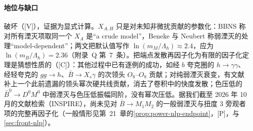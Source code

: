 \paragraph{地位与缺口}
破坏（[V]），证据为显式计算。$X_{A,H}$ 只是对未知非微扰贡献的参数化：BBNS 称对所有湮灭项取同一个 $X_A$ 是“a crude model”\cite{BenekeEtAl2001}，Beneke 与 Neubert 称弱湮灭的处理“model-dependent”\cite{BenekeNeubert2003}；两文把默认值写作 $\ln(m_M/\Lambda_h)\approx2.4$，应为 $\ln(m_B/\Lambda_h)=2.36$（附录~Q 第~7~条）。把端点发散再因子化为有限的因子化定理是猜想性质的（[C]）：其他过程中已有逐例的成功，如经 $b$ 夸克圈的 $h\to\gamma\gamma$\cite{Liu:2019oav,Liu:2020wbn}、经轻夸克的 $gg\to h$\cite{Liu:2022ajh}、$\bar B\to X_s\gamma$ 的次领头 $O_8$--$O_8$ 贡献\cite{Hurth:2023paz}；对纯弱湮灭衰变，有文献补上一个此前遗漏的领头幂次硬共线贡献，消去了卷积中的快度发散\cite{Lu:2022kos}；色压低的 $\bar B^0\to D^0M^0$ 中弱湮灭与色压低振幅同阶，没有幂次压低\cite{Mantry:2003uz}。据我们截至 2026 年 10 月的文献检索（INSPIRE），尚未见对 $\bar B\to M_1M_2$ 的一般弱湮灭与扭度 3 旁观者项的完整再因子化（一般情形见第~21~章的\cref{prop:power-nlp-endpoint}，[P]，与\cref{sec:front-nlp}）。
